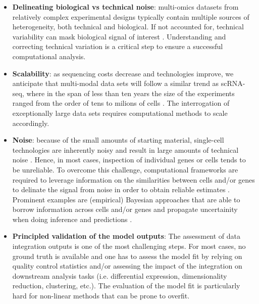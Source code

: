 \begin{itemize}
	\item \textbf{Delineating biological vs technical noise}: multi-omics datasets from relatively complex experimental designs typically contain multiple sources of heterogeneity, both technical and biological. If not accounted for, technical variability can mask biological signal of interest \cite{Buettner2015}. Understanding and correcting technical variation is a critical step to ensure a successful computational analysis.

	\item \textbf{Scalability}: as sequencing costs decrease and technologies improve, we anticipate that multi-modal data sets will follow a similar trend as scRNA-seq, where in the span of less than ten years the size of the experiments ranged from the order of tens to milions of cells \cite{Svensson2018}. The interrogation of exceptionally large data sets requires computational methods to scale accordingly.

	\item \textbf{Noise}: because of the small amounts of starting material, single-cell technologies are inherently noisy and result in large amounts of technical noise \cite{Stegle2015}. Hence, in most cases, inspection of individual genes or cells tends to be unreliable. To overcome this challenge, computational frameworks are required to leverage information on the similarities between cells and/or genes to delinate the signal from noise in order to obtain reliable estimates \cite{Vallejos2015}. Prominent examples are (empirical) Bayesian approaches that are able to borrow information across cells and/or genes and propagate uncertainity when doing inference and predictions \cite{Kharchenko2014}.


	\item \textbf{Principled validation of the model outputs}: The assessment of data integration outputs is one of the most challenging steps. For most cases, no ground truth is available and one has to assess the model fit by relying on quality control statistics and/or assessing the impact of the integration on downstream analysis tasks (i.e. differential expression, dimensionality reduction, clustering, etc.). The evaluation of the model fit is particularly hard for non-linear methods that can be prone to overfit. 

\end{itemize}

